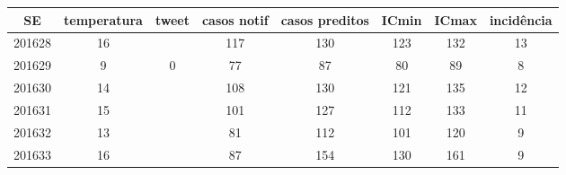 \begin{tabular}{c|ccccccc}
  \hline
SE & temperatura & tweet & casos notif & casos preditos & ICmin & ICmax & incidência \\ 
  \hline
201628 & 16 &  & 117 & 130 & 123 & 132 & 13 \\ 
  201629 & 9 & 0 & 77 & 87 & 80 & 89 & 8 \\ 
  201630 & 14 &  & 108 & 130 & 121 & 135 & 12 \\ 
  201631 & 15 &  & 101 & 127 & 112 & 133 & 11 \\ 
  201632 & 13 &  & 81 & 112 & 101 & 120 & 9 \\ 
  201633 & 16 &  & 87 & 154 & 130 & 161 & 9 \\ 
   \hline
\end{tabular}
